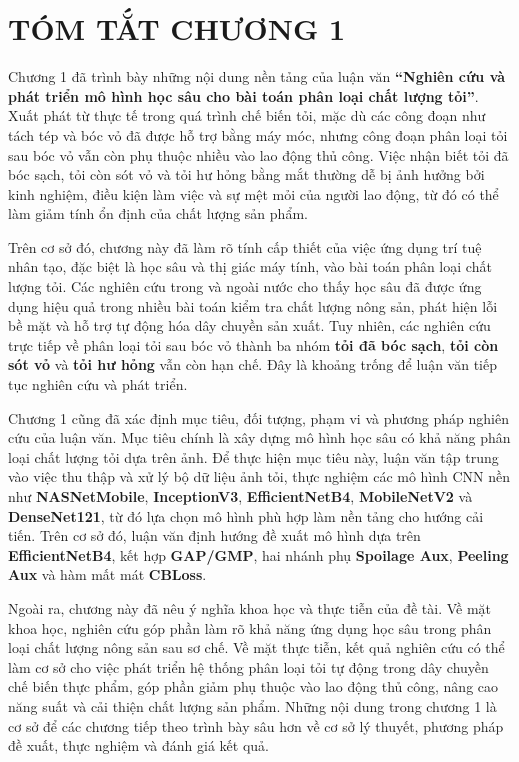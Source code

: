 \documentclass[
]{article}
\begin{document}
\section{TÓM TẮT CHƯƠNG 1}\label{tuxf3m-tux1eaft-chux1b0ux1a1ng-1}

Chương 1 đã trình bày những nội dung nền tảng của luận văn
\textbf{``Nghiên cứu và phát triển mô hình học sâu cho bài toán phân
loại chất lượng tỏi''}. Xuất phát từ thực tế trong quá trình chế biến
tỏi, mặc dù các công đoạn như tách tép và bóc vỏ đã được hỗ trợ bằng máy
móc, nhưng công đoạn phân loại tỏi sau bóc vỏ vẫn còn phụ thuộc nhiều
vào lao động thủ công. Việc nhận biết tỏi đã bóc sạch, tỏi còn sót vỏ và
tỏi hư hỏng bằng mắt thường dễ bị ảnh hưởng bởi kinh nghiệm, điều kiện
làm việc và sự mệt mỏi của người lao động, từ đó có thể làm giảm tính ổn
định của chất lượng sản phẩm.

Trên cơ sở đó, chương này đã làm rõ tính cấp thiết của việc ứng dụng trí
tuệ nhân tạo, đặc biệt là học sâu và thị giác máy tính, vào bài toán
phân loại chất lượng tỏi. Các nghiên cứu trong và ngoài nước cho thấy
học sâu đã được ứng dụng hiệu quả trong nhiều bài toán kiểm tra chất
lượng nông sản, phát hiện lỗi bề mặt và hỗ trợ tự động hóa dây chuyền
sản xuất. Tuy nhiên, các nghiên cứu trực tiếp về phân loại tỏi sau bóc
vỏ thành ba nhóm \textbf{tỏi đã bóc sạch}, \textbf{tỏi còn sót vỏ} và
\textbf{tỏi hư hỏng} vẫn còn hạn chế. Đây là khoảng trống để luận văn
tiếp tục nghiên cứu và phát triển.

Chương 1 cũng đã xác định mục tiêu, đối tượng, phạm vi và phương pháp
nghiên cứu của luận văn. Mục tiêu chính là xây dựng mô hình học sâu có
khả năng phân loại chất lượng tỏi dựa trên ảnh. Để thực hiện mục tiêu
này, luận văn tập trung vào việc thu thập và xử lý bộ dữ liệu ảnh tỏi,
thực nghiệm các mô hình CNN nền như \textbf{NASNetMobile},
\textbf{InceptionV3}, \textbf{EfficientNetB4}, \textbf{MobileNetV2} và
\textbf{DenseNet121}, từ đó lựa chọn mô hình phù hợp làm nền tảng cho
hướng cải tiến. Trên cơ sở đó, luận văn định hướng đề xuất mô hình dựa
trên \textbf{EfficientNetB4}, kết hợp \textbf{GAP/GMP}, hai nhánh phụ
\textbf{Spoilage Aux}, \textbf{Peeling Aux} và hàm mất mát
\textbf{CBLoss}.

Ngoài ra, chương này đã nêu ý nghĩa khoa học và thực tiễn của đề tài. Về
mặt khoa học, nghiên cứu góp phần làm rõ khả năng ứng dụng học sâu trong
phân loại chất lượng nông sản sau sơ chế. Về mặt thực tiễn, kết quả
nghiên cứu có thể làm cơ sở cho việc phát triển hệ thống phân loại tỏi
tự động trong dây chuyền chế biến thực phẩm, góp phần giảm phụ thuộc vào
lao động thủ công, nâng cao năng suất và cải thiện chất lượng sản phẩm.
Những nội dung trong chương 1 là cơ sở để các chương tiếp theo trình bày
sâu hơn về cơ sở lý thuyết, phương pháp đề xuất, thực nghiệm và đánh giá
kết quả.
\end{document}
